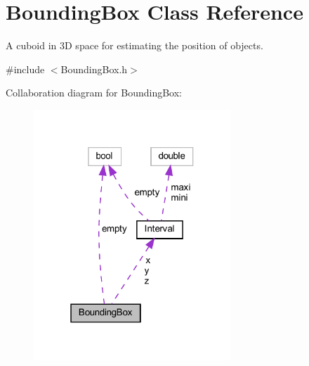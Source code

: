 \hypertarget{classBoundingBox}{}\section{Bounding\+Box Class Reference}
\label{classBoundingBox}


A cuboid in 3D space for estimating the position of objects.  




{\ttfamily \#include $<$Bounding\+Box.\+h$>$}



Collaboration diagram for Bounding\+Box\+:
\nopagebreak
\begin{figure}[H]
\begin{center}
\leavevmode
\includegraphics[width=211pt]{classBoundingBox__coll__graph}
\end{center}
\end{figure}
